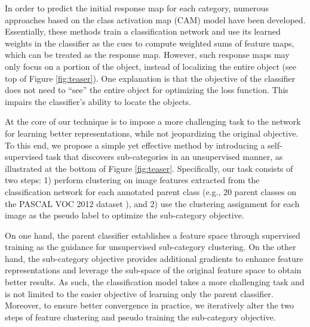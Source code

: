\documentclass[10pt,twocolumn,letterpaper]{article}
\begin{document}
In order to predict the initial response map for each category, numerous approaches based on the 
class activation map (CAM) model \cite{zhou2016learning}  
have been developed. 
Essentially, these methods train a classification network and use its learned weights in the classifier as the cues to compute weighted sums of feature maps, which can be treated as the response map.
However, such response maps may only focus on a portion of the object, instead of localizing the entire object (see top of Figure \ref{fig:teaser}).
One explanation is that the objective of the classifier does not need to ``see'' the entire object for optimizing the loss function.
This impairs the classifier's ability to locate the objects.

At the core of our technique is to impose a more challenging task to the network for learning better representations, while not jeopardizing the original objective.
To this end, we propose a simple yet effective method by introducing a self-supervised task that discovers sub-categories in an unsupervised manner, as illustrated at the bottom of Figure \ref{fig:teaser}.
Specifically, our task consists of two steps: 1) perform clustering on image features extracted from the classification network for each annotated parent class (e.g., 20 parent classes on the PASCAL VOC 2012 dataset \cite{PASCAL_VOC_2010_Data}), and 2) use the clustering assignment for each image as the pseudo label to optimize the sub-category objective.


On one hand, the parent classifier establishes a feature space through supervised training as the guidance for unsupervised sub-category clustering.
On the other hand, the sub-category objective provides additional gradients to enhance feature representations and leverage the sub-space of the original feature space to obtain better results.
As such, the classification model takes a more challenging task and is not limited to the easier objective of learning only the parent classifier.
Moreover, to ensure better convergence in practice, we iteratively alter the two steps of feature clustering and pseudo training the sub-category objective.
\end{document}
